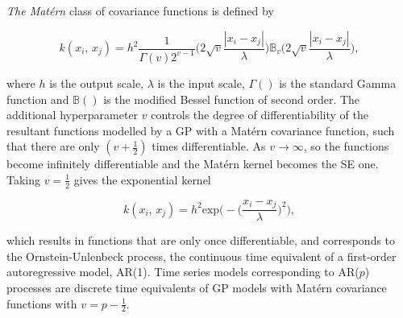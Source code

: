          \vspace{1em}

         \textit{The Mat\'ern} class of covariance functions is defined by

         \[k(x_{i}, \, x_{j}) = h^{2} \frac{1}{\Gamma(v)2^{v-1}} \bigg(2\sqrt{v}\frac{|x_{i} - x_{j}|}{\lambda} \bigg) \mathbb{B}_{v} \bigg(2\sqrt{v}\frac{|x_{i} - x_{j}|}{\lambda} \bigg),\]

         where \(h\) is the output scale, \(\lambda\) is the input scale, \(\Gamma()\) is the standard Gamma function and \(\mathbb{B}()\) is the modified Bessel function of second order. The additional hyperparameter \(v\) controls the degree of differentiability of the resultant functions modelled by a GP with a Mat\'ern covariance function, such that there are only \((v + \frac{1}{2})\) times differentiable. As \(v \to \infty\), so the functions become infinitely differentiable and the Mat\'ern kernel becomes the SE one. Taking \(v = \frac{1}{2}\) gives the exponential kernel

         \[k(x_{i}, \, x_{j}) = h^{2} \text{exp} \bigg(- \Big(\frac{x_i - x_j}{\lambda} \Big)^2 \bigg),\]

         which results in functions that are only once differentiable, and corresponds to the Ornstein-Unlenbeck process, the continuous time equivalent of a first-order autoregressive model, AR(1). Time series models corresponding to AR(\(p\)) processes are discrete time equivalents of GP models with Mat\'ern covariance functions with \(v = p - \frac{1}{2}\).

         \vspace{1em}

